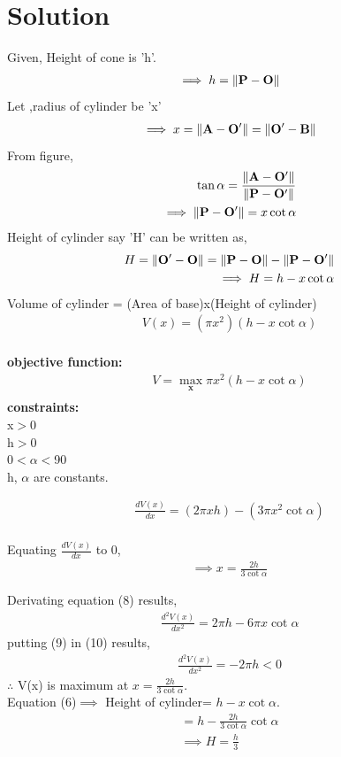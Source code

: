 \documentclass[10pt, a4paper]{article}
\let\vec\mathbf
\begin{document}
\section{Solution}
Given, Height of cone is 'h'.
\begin{align}
\implies h= \norm{\vec{P}-\vec{O}}
\end{align}
Let ,radius of cylinder be 'x'
\begin{align}
\implies x= \norm{\vec{A}-\vec{O^\prime}}=\norm{\vec{O^\prime}-\vec{B}}
\end{align}
From figure,
\begin{align}
\tan\alpha=\frac{\norm{\vec{A}-\vec{O^\prime}}}{\norm{\vec{P}-\vec{O^\prime}}}\\
\implies\norm{\vec{P}-\vec{O^\prime}}=x\cot\alpha
\end{align}
Height of cylinder say 'H' can be written as,
\begin{align}
H=\norm{\vec{O^\prime}-\vec{O}}=\norm{\vec{P}-\vec{O}}-\norm{\vec{P}-\vec{O^\prime}}\\
\implies H=h-x\cot\alpha
\end{align}
Volume of cylinder = (Area of base)x(Height of cylinder)
\begin{align}
V(x)=(\pi x^2) (h-x\cot\alpha)\\
\end{align}
\begin{center}
\textbf{objective function:}
\begin{align}
V= \max_\vec{x}\pi x^2(h-x\cot\alpha)\\
\end{align}
\textbf{constraints:}\\
x$>$0\\
h$>$0\\
0$<\alpha<$90\\
h, $\alpha$ are constants.
\end{center}
\begin{align}
\frac{dV(x)}{dx}=(2\pi xh)-(3\pi x^2 \cot\alpha)\\
\end{align}


Equating $\frac{dV(x)}{dx}$ to 0,
\begin{align}
  \implies x=\frac{2h}{3\cot\alpha}
\end{align}


Derivating equation (8) results,
\begin{align}
\frac{d^2 V(x)}{dx^2}=2\pi h-6\pi x\cot\alpha
\end{align}
putting (9) in (10) results,
\begin{align}
\frac{d^2 V(x)}{dx^2}=-2\pi h <0
\end{align}
$\therefore$ V(x) is maximum at $x=\frac{2h}{3\cot\alpha}$. \\
Equation (6)$\implies$
 Height of cylinder= $h-x\cot\alpha$.\\
\begin{align}
=h-\frac{2h}{3\cot\alpha}\cot\alpha\\
\implies H=\frac{h}{3}
\end{align}
\end{document}
